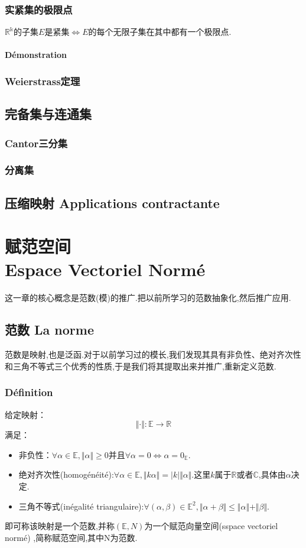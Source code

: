 \documentclass[12pt, a4paper, oneside]{ctexbook}
\newcommand{\R }{\mathbb{R}}%
\begin{document}
  \subsection{实紧集的极限点}
  $\mathbb{R^k}$的子集$E$是紧集$\Leftrightarrow$$E$的每个无限子集在其中都有一个极限点.
  \subsubsection{Démonstration}
  \subsection{Weierstrass定理}

  \section{完备集与连通集}
  \subsection{Cantor三分集}
  \subsection{分离集}
  \section{压缩映射 Applications contractante}\label{myref:yasuoyingshe}

  

\chapter{赋范空间\\Espace Vectoriel Normé}
  这一章的核心概念是范数(模)的推广.把以前所学习的范数抽象化,然后推广应用.
\section{范数 La norme}
  范数是映射,也是泛函.对于以前学习过的模长,我们发现其具有非负性、绝对齐次性和三角不等式三个优秀的性质,于是我们将其提取出来并推广,重新定义范数.
  \subsection{Définition}
  给定映射：
  $$
  \Vert \cdot \Vert : \mathbb{E} \longrightarrow \R
  $$
  满足：\begin{itemize}
    \item 非负性：$\forall\alpha\in\mathbb{E}, \Vert \alpha \Vert\ge0$并且$\forall\alpha=0\Leftrightarrow \alpha=0_\mathbb{E}$.
    \item 绝对齐次性(homogénéité):$\forall\alpha\in\mathbb{E}, \Vert k\alpha \Vert=| k | \Vert \alpha \Vert$.这里$k$属于$\R$或者$\mathbb{C}$,具体由$\alpha$决定.
    \item 三角不等式(inégalité triangulaire):$\forall(\alpha,\beta)\in\mathbb{E}^2, \Vert \alpha+\beta \Vert\leq\Vert \alpha \Vert+\Vert \beta \Vert$.
  \end{itemize}
  即可称该映射是一个范数,并称$(\mathbb{E},N)$为一个赋范向量空间(sspace vectoriel normé)
  ,简称赋范空间,其中N为范数.
\end{document}
